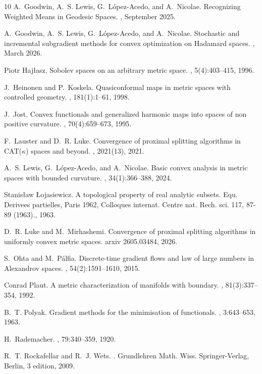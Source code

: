 \documentclass{article}
\theoremstyle{plain}\newtheorem{theorem}{Theorem}[section]
\theoremstyle{plain}\newtheorem{definition}[theorem]{Definition}
\theoremstyle{plain}\newtheorem{lemma}[theorem]{Lemma}
\theoremstyle{definition}\newtheorem{remark}[theorem]{Remark}
\theoremstyle{definition}\newtheorem{example}[theorem]{Example}
\theoremstyle{plain}\newtheorem{proposition}[theorem]{Proposition}
\theoremstyle{plain}\newtheorem{inference}[theorem]{Inference}
\theoremstyle{plain}\newtheorem{corollary}[theorem]{Corollary}
\theoremstyle{plain}\newtheorem{assumption}[theorem]{Assumption}
\begin{document}
\begin{thebibliography}{10}
A.~Goodwin, A.~S. Lewis, G.~{L{\'o}pez-Acedo}, and A.~Nicolae.
\newblock Recognizing {{Weighted Means}} in {{Geodesic Spaces}}.
, September 2025.

A.~Goodwin, A.~S. Lewis, G.~{L{\'o}pez-Acedo}, and A.~Nicolae.
\newblock Stochastic and incremental subgradient methods for convex
  optimization on {{Hadamard}} spaces.
, March 2026.

Piotr Haj{\l}asz.
\newblock Sobolev spaces on an arbitrary metric space.
, 5(4):403--415, 1996.

J.~Heinonen and P.~Koskela.
\newblock Quasiconformal maps in metric spaces with controlled geometry.
, 181(1):1--61, 1998.

J.~Jost.
\newblock Convex functionals and generalized harmonic maps into spaces of non
  positive curvature.
, 70(4):659--673, 1995.

F.~Lauster and D.~R. Luke.
\newblock Convergence of proximal splitting algorithms in {{CAT}}({{$\kappa$}})
  spaces and beyond.
, 2021(13), 2021.

A.~S. Lewis, G.~{L{\'o}pez-Acedo}, and A.~Nicolae.
\newblock Basic convex analysis in metric spaces with bounded curvature.
, 34(1):366--388, 2024.

Stanis{\l}aw {\L}ojasiewicz.
\newblock A topological property of real analytic subsets.
\newblock Equ. {Derivees} partielles, {Paris} 1962, {Colloques} internat.
  {Centre} nat. {Rech}. sci. 117, 87-89 (1963)., 1963.

D.~R. Luke and M.~Mirhashemi.
\newblock Convergence of proximal splitting algorithms in uniformly convex
  metric spaces.
\newblock arxiv 2605.03484, 2026.

S.~Ohta and M.~P{\'a}lfia.
\newblock Discrete-time gradient flows and law of large numbers in
  {{Alexandrov}} spaces.
, 54(2):1591--1610, 2015.

Conrad Plaut.
\newblock A metric characterization of manifolds with boundary.
, 81(3):337--354, 1992.

B.~T. Polyak.
\newblock Gradient methods for the minimisation of functionals.
, 3:643--653, 1963.

H.~Rademacher.
, 79:340--359, 1920.

R.~T. Rockafellar and R.~J. Wets.
.
\newblock Grundlehren Math. {{Wiss}}. Springer-Verlag, Berlin, 3 edition, 2009.

\end{thebibliography}
\end{document}
